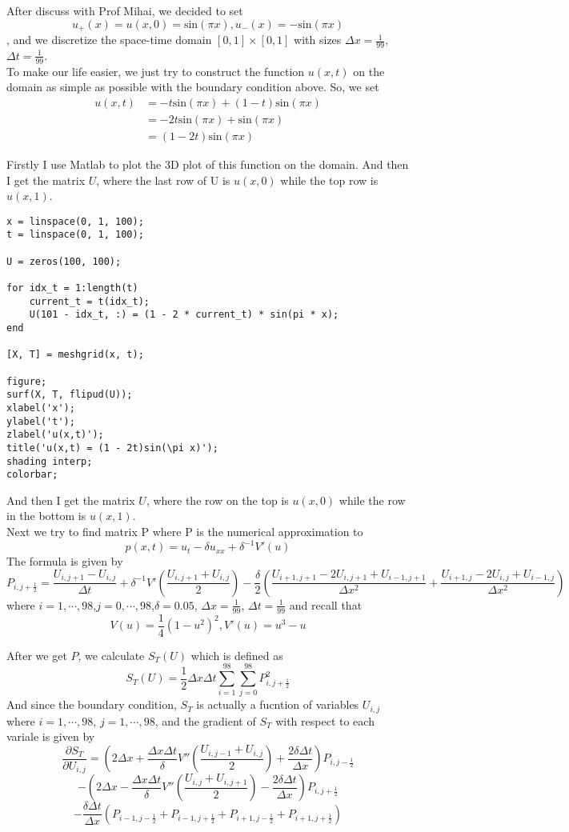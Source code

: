 \documentclass{article}
\begin{document}
\noindent
After discuss with Prof Mihai, we decided to set $$u_{+}(x) = u(x,0) = \text{sin}(\pi x), u_{-}(x) = -\text{sin}(\pi x)$$, and we discretize the space-time domain $[0,1] \times [0,1]$ with sizes $\Delta x = \frac{1}{99}$, $\Delta t = \frac{1}{99}$.\\
To make our life easier, we just try to construct the function $u(x,t)$ on the domain as simple as possible with the boundary condition above. So, we set
\begin{align*}
  u(x,t) &= -t\text{sin}(\pi x) + (1 - t) \text{sin}(\pi x)\\
  &= -2t\text{sin}(\pi x) + \text{sin}(\pi x)\\
  &= (1 - 2t)\text{sin}(\pi x)
\end{align*}

\noindent
Firstly I use Matlab to plot the 3D plot of this function on the domain.
And then I get the matrix $U$, where the last row of U is $u(x,0)$ while the top row is $u(x,1)$.
\begin{lstlisting}
x = linspace(0, 1, 100);
t = linspace(0, 1, 100);

U = zeros(100, 100);

for idx_t = 1:length(t)
    current_t = t(idx_t);
    U(101 - idx_t, :) = (1 - 2 * current_t) * sin(pi * x);
end

[X, T] = meshgrid(x, t);

figure;
surf(X, T, flipud(U));
xlabel('x');
ylabel('t');
zlabel('u(x,t)');
title('u(x,t) = (1 - 2t)sin(\pi x)');
shading interp;
colorbar;
\end{lstlisting}
\noindent
And then I get the matrix $U$, where the row on the top is $u(x,0)$ while the row in the bottom is $u(x,1)$.\\
Next we try to find matrix P where P is the numerical approximation to $$p(x,t) = u_t  -\delta u_{xx} +\delta ^{-1} V'(u)$$
The formula is given by 
\[
P_{i,j+\frac{1}{2}} = \frac{U_{i,j+1} - U_{i,j}}{\Delta t} + \delta^{-1}V'\left(\frac{U_{i,j+1}+ U_{i,j}}{2}\right)- \frac{\delta}{2}\left(\frac{U_{i+1,j+1} - 2U_{i,j+1} + U_{i-1,j+1}}{\Delta x ^2}+ \frac{U_{i+1,j} - 2U_{i,j} + U_{i-1,j}}{\Delta x ^2}\right)
\]
where $i = 1,\cdots,98$,\quad $j = 0,\cdots, 98$,\quad$\delta = 0.05$, $\Delta x = \frac{1}{99}$, $\Delta t = \frac{1}{99}$ and recall that $$V(u) = \frac{1}{4}(1 - u^2)^2, V'(u) = u^3 - u$$

\noindent
After we get $P$, we calculate $S_T(U)$ which is defined as $$S_T(U) = \frac{1}{2}\Delta x\Delta t \sum_{i = 1}^{98} \sum_{j = 0}^{98} P_{i,j+\frac{1}{2}}^2$$
And since the boundary condition, $S_T$ is actually a fucntion of variables $U_{i,j}$ where $i = 1,\cdots, 98$, \quad $j = 1,\cdots, 98$, and the gradient of $S_T$ with respect to each variale is given by 
\[
\frac{\partial S_T}{\partial U_{i,j}} = \left(2\Delta x + \frac{\Delta x \Delta t}{\delta}V''\left(\frac{U_{i,j-1} + U_{i,j}}{2}\right) + \frac{2\delta \Delta t}{\Delta x}\right) P_{i,j-\frac{1}{2}} 
\]
\[
- \left(2\Delta x - \frac{\Delta x \Delta t}{\delta}V''\left(\frac{U_{i,j} + U_{i,j+1}}{2}\right) - \frac{2\delta \Delta t}{\Delta x}\right)P_{i,j+\frac{1}{2}} 
\]
\[
- \frac{\delta \Delta t}{\Delta x}\left(P_{i-1,j-\frac{1}{2}} + P_{i-1,j+\frac{1}{2}} + P_{i+1,j-\frac{1}{2}} + P_{i+1, j+\frac{1}{2}}\right)
\]
\end{document}
